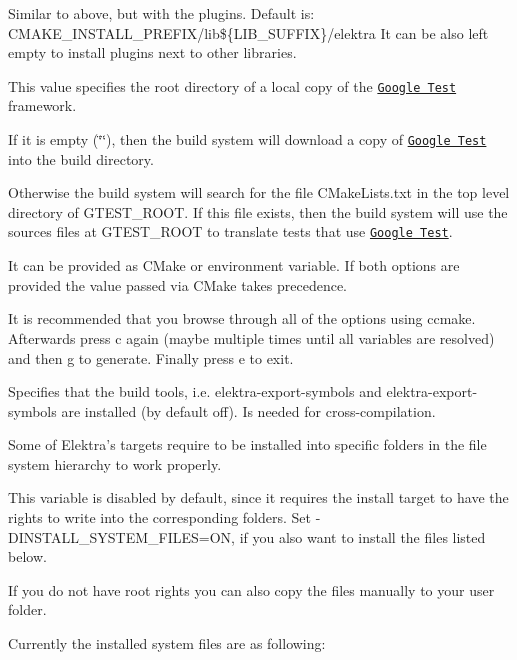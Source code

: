 Similar to above, but with the plugins. Default is\+: {\ttfamily C\+M\+A\+K\+E\+\_\+\+I\+N\+S\+T\+A\+L\+L\+\_\+\+P\+R\+E\+F\+I\+X/lib\$\{L\+I\+B\+\_\+\+S\+U\+F\+F\+IX\}/elektra} It can be also left empty to install plugins next to other libraries.

This value specifies the root directory of a local copy of the \href{https://github.com/google/googletest}{\tt Google Test} framework.


\begin{DoxyItemize}
\item If it is empty ({\ttfamily \char`\"{}\char`\"{}}), then the build system will download a copy of \href{https://github.com/google/googletest}{\tt Google Test} into the build directory.
\item Otherwise the build system will search for the file {\ttfamily C\+Make\+Lists.\+txt} in the top level directory of {\ttfamily G\+T\+E\+S\+T\+\_\+\+R\+O\+OT}. If this file exists, then the build system will use the sources files at {\ttfamily G\+T\+E\+S\+T\+\_\+\+R\+O\+OT} to translate tests that use \href{https://github.com/google/googletest}{\tt Google Test}.
\end{DoxyItemize}

It can be provided as C\+Make or environment variable. If both options are provided the value passed via C\+Make takes precedence.

It is recommended that you browse through all of the options using {\ttfamily ccmake}. Afterwards press {\ttfamily c} again (maybe multiple times until all variables are resolved) and then {\ttfamily g} to generate. Finally press {\ttfamily e} to exit.

Specifies that the build tools, i.\+e. {\ttfamily elektra-\/export-\/symbols} and {\ttfamily elektra-\/export-\/symbols} are installed (by default off). Is needed for cross-\/compilation.

Some of Elektra’s targets require to be installed into specific folders in the file system hierarchy to work properly.

This variable is disabled by default, since it requires the install target to have the rights to write into the corresponding folders. Set {\ttfamily -\/\+D\+I\+N\+S\+T\+A\+L\+L\+\_\+\+S\+Y\+S\+T\+E\+M\+\_\+\+F\+I\+L\+ES=ON}, if you also want to install the files listed below.

If you do not have root rights you can also copy the files manually to your user folder.

Currently the installed system files are as following\+:

